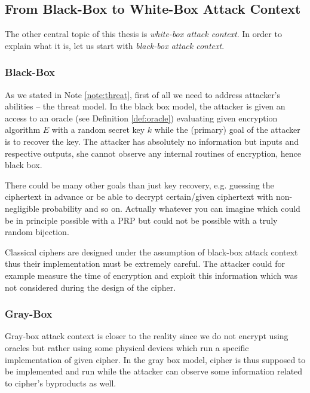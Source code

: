 
\subsection{From Black-Box to White-Box Attack Context}
\label{sec:bbtowb}

The other central topic of this thesis is {\em white-box attack context}. In order to explain what it is, let us start with {\em black-box attack context}.

\subsubsection{Black-Box}

As we stated in Note \ref{note:threat}, first of all we need to address attacker's abilities -- the threat model. In the black box model, the attacker is given an access to an oracle (see Definition \ref{def:oracle}) evaluating given encryption algorithm $E$ with a random secret key $k$ while the (primary) goal of the attacker is to recover the key. The attacker has absolutely no information but inputs and respective outputs, she cannot observe any internal routines of encryption, hence black box.

\begin{note}
	There could be many other goals than just key recovery, e.g. guessing the ciphertext in advance or be able to decrypt certain/given ciphertext with non-negligible probability and so on. Actually whatever you can imagine which could be in principle possible with a PRP but could not be possible with a truly random bijection.
\end{note}

Classical ciphers are designed under the assumption of black-box attack context thus their implementation must be extremely careful. The attacker could for example measure the time of encryption and exploit this information which was not considered during the design of the cipher.

\subsubsection{Gray-Box}

Gray-box attack context is closer to the reality since we do not encrypt using oracles but rather using some physical devices which run a specific implementation of given cipher. In the gray box model, cipher is thus supposed to be implemented and run while the attacker can observe some information related to cipher's byproducts as well.


